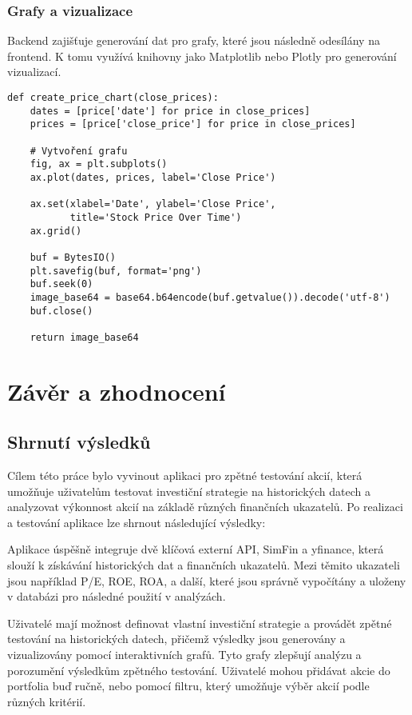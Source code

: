 \documentclass[12pt, a4paper]{report}
\begin{document}
\subsection{Grafy a vizualizace}

Backend zajišťuje generování dat pro grafy, které jsou následně odesílány na frontend. K tomu využívá knihovny jako Matplotlib nebo Plotly pro generování vizualizací.

\begin{lstlisting}[style=Python, caption= Kód pro generování grafů]
def create_price_chart(close_prices):
    dates = [price['date'] for price in close_prices]
    prices = [price['close_price'] for price in close_prices]

    # Vytvoření grafu
    fig, ax = plt.subplots()
    ax.plot(dates, prices, label='Close Price')

    ax.set(xlabel='Date', ylabel='Close Price',
           title='Stock Price Over Time')
    ax.grid()

    buf = BytesIO()
    plt.savefig(buf, format='png')
    buf.seek(0)
    image_base64 = base64.b64encode(buf.getvalue()).decode('utf-8')
    buf.close()

    return image_base64
\end{lstlisting}


\chapter{Závěr a zhodnocení}


\section{Shrnutí výsledků}

Cílem této práce bylo vyvinout aplikaci pro zpětné testování akcií, která umožňuje uživatelům testovat investiční strategie na historických datech a analyzovat výkonnost akcií na základě různých finančních ukazatelů. Po realizaci a testování aplikace lze shrnout následující výsledky:

Aplikace úspěšně integruje dvě klíčová externí API, SimFin a yfinance, která slouží k získávání historických dat a finančních ukazatelů. Mezi těmito ukazateli jsou například P/E, ROE, ROA, a další, které jsou správně vypočítány a uloženy v databázi pro následné použití v analýzách.

Uživatelé mají možnost definovat vlastní investiční strategie a provádět zpětné testování na historických datech, přičemž výsledky jsou generovány a vizualizovány pomocí interaktivních grafů. Tyto grafy zlepšují analýzu a porozumění výsledkům zpětného testování. Uživatelé mohou přidávat akcie do portfolia buď ručně, nebo pomocí filtru, který umožňuje výběr akcií podle různých kritérií.
\end{document}
